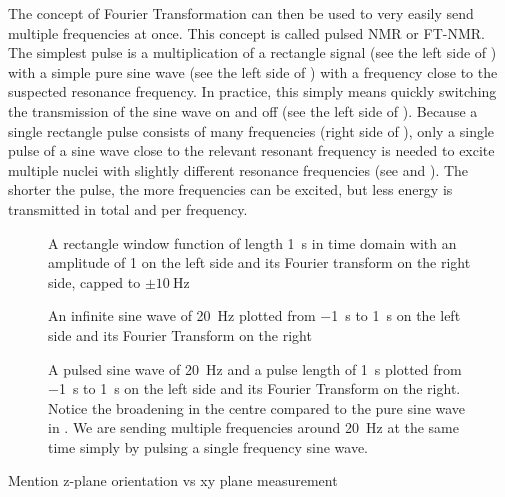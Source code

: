 The concept of Fourier Transformation can then be used to very easily send multiple frequencies at once. This concept is called pulsed NMR or FT-NMR. The simplest pulse is a multiplication of a rectangle signal (see the left side of ) with a simple pure sine wave (see the left side of ) with a frequency close to the suspected resonance frequency. In practice, this simply means quickly switching the transmission of the sine wave on and off (see the left side of ). Because a single rectangle pulse consists of many frequencies (right side of ), only a single pulse of a sine wave close to the relevant resonant frequency is needed to excite multiple nuclei with slightly different resonance frequencies (see  and ). The shorter the pulse, the more frequencies can be excited, but less energy is transmitted in total and per frequency.
\begin{figure}[tbh]
    
    \caption{A rectangle window function of length \qty{1}{\second} in time domain with an amplitude of 1 on the left side and its Fourier transform on the right side, capped to \(\pm{}\qty{10}{\hertz}\)}
\end{figure}

\begin{figure}[tbh]
    
    \caption{An infinite sine wave of \qty{20}{\hertz} plotted from \qty{-1}{\second} to \qty{1}{\second} on the left side and its Fourier Transform on the right}
\end{figure}

\begin{figure}[tbh]
    
    \caption{A pulsed sine wave of \qty{20}{\hertz} and a pulse length of \qty{1}{\second} plotted from \qty{-1}{\second} to \qty{1}{\second} on the left side and its Fourier Transform on the right. Notice the broadening in the centre compared to the pure sine wave in . We are sending multiple frequencies around \qty{20}{\hertz} at the same time simply by pulsing a single frequency sine wave.}
\end{figure}

Mention z-plane orientation vs xy plane measurement

